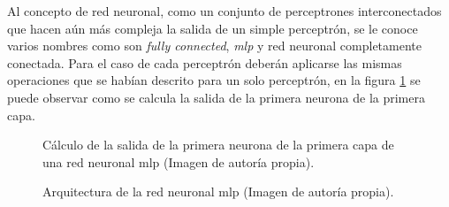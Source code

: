 \par Al concepto de red neuronal, como un conjunto de perceptrones interconectados que hacen aún más compleja la salida de un simple perceptrón, se le conoce varios nombres como son \textit{fully connected}, \textit{\gls{mlp}} y red neuronal completamente conectada. Para el caso de cada perceptrón deberán aplicarse las mismas operaciones que se habían descrito para un solo perceptrón, en la figura \ref{fig:redneuronal1} se puede observar como se calcula la salida de la primera neurona de la primera capa.

\begin{figure}[H]
	\centering
	
	\caption{Cálculo de la salida de la primera neurona de la primera capa de una red neuronal \gls{mlp} (Imagen de autoría propia).}
	\label{fig:redneuronal1}
\end{figure}


\begin{figure}
	\centering
	
	\caption{Arquitectura de la red neuronal \gls{mlp} (Imagen de autoría propia).}
	\label{fig:redneuronal}
\end{figure}

